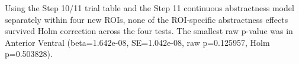 Using the Step 10/11 trial table and the Step 11 continuous abstractness model separately within four new ROIs, none of the ROI-specific abstractness effects survived Holm correction across the four tests. The smallest raw p-value was in Anterior Ventral (beta=1.642e-08, SE=1.042e-08, raw p=0.125957, Holm p=0.503828).

